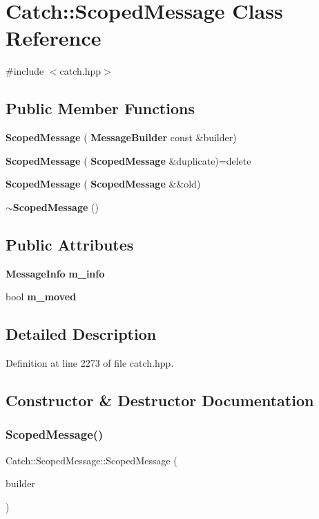 \section{Catch\+::Scoped\+Message Class Reference}
\label{class_catch_1_1_scoped_message}


{\ttfamily \#include $<$catch.\+hpp$>$}

\subsection*{Public Member Functions}
\begin{DoxyCompactItemize}
\item 
\textbf{ Scoped\+Message} (\textbf{ Message\+Builder} const \&builder)
\item 
\textbf{ Scoped\+Message} (\textbf{ Scoped\+Message} \&duplicate)=delete
\item 
\textbf{ Scoped\+Message} (\textbf{ Scoped\+Message} \&\&old)
\item 
\textbf{ $\sim$\+Scoped\+Message} ()
\end{DoxyCompactItemize}
\subsection*{Public Attributes}
\begin{DoxyCompactItemize}
\item 
\textbf{ Message\+Info} \textbf{ m\+\_\+info}
\item 
bool \textbf{ m\+\_\+moved}
\end{DoxyCompactItemize}


\subsection{Detailed Description}


Definition at line 2273 of file catch.\+hpp.



\subsection{Constructor \& Destructor Documentation}
\mbox{\label{class_catch_1_1_scoped_message_a5cc59f0f2ebe840e6607f83004d49a17}} 
\subsubsection{ScopedMessage()\hspace{0.1cm}{\footnotesize\ttfamily [1/3]}}
{\footnotesize\ttfamily Catch\+::\+Scoped\+Message\+::\+Scoped\+Message (\begin{DoxyParamCaption}\item[{\textbf{ Message\+Builder} const \&}]{builder }\end{DoxyParamCaption})\hspace{0.3cm}{\ttfamily [explicit]}}

